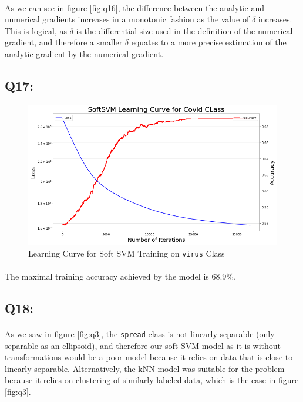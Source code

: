 \documentclass{article}
\newcommand{\code}[1]{\texttt{#1}}
\begin{document}
    \paragraph*{}
    As we can see in figure \ref{fig:q16}, the difference between the analytic and numerical gradients increases in a  monotonic fashion as the value of $\delta$ increases. This is logical, as $\delta$ is the differential size used in the definition of the numerical gradient, and therefore a smaller $\delta$  equates to a more precise estimation of the analytic gradient by the numerical gradient.
\subsection*{Q17:}
    \begin{figure}[H]
        \centering
        \includegraphics[scale=0.48]{q17.png}
        \caption{Learning Curve for Soft SVM Training on \code{virus} Class}
        \label{fig:q17}
    \end{figure}
    \paragraph*{}
    The maximal training accuracy achieved by the model is $68.9\%$.
\subsection*{Q18:}
    \paragraph*{}
    As we saw in figure \ref{fig:q3}, the \code{spread} class is not linearly separable (only separable as an ellipsoid), and therefore our soft SVM model as it is without transformations would be a poor model because it relies on data that is close to linearly separable. Alternatively, the kNN model was suitable for the problem because it relies on clustering of similarly labeled data, which is the case in figure \ref{fig:q3}.
\end{document}
